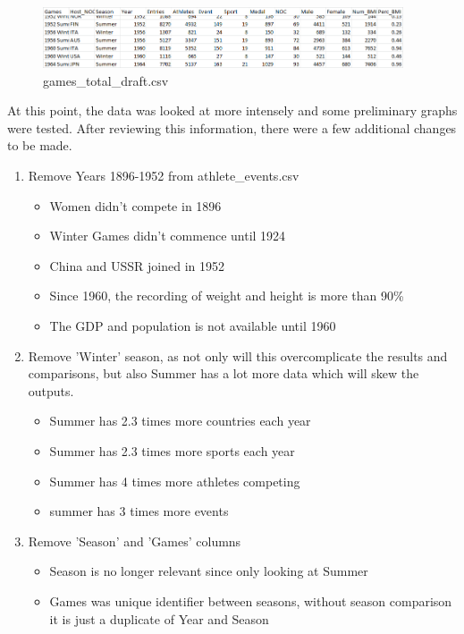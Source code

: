 \documentclass[a4 paper, 12pt]{article}
\begin{document}
        \begin{figure} [H]
            \centering
            \includegraphics[width=0.95\textwidth, frame]
                {./images/data/games_draft.png}     
            \caption{games\_total\_draft.csv}               
        \end{figure} 

    At this point, the data was looked at more intensely and some preliminary graphs were tested. After reviewing this information, there were a few additional changes to be made. 
        \begin{enumerate}
            \item Remove Years 1896-1952 from athlete\_events.csv
                \begin{itemize}
                    \item Women didn't compete in 1896
                    \item Winter Games didn't commence until 1924
                    \item China and USSR joined in 1952
                    \item Since 1960, the recording of weight and height is more than 90\% 
                    \item The GDP and population is not available until 1960
                \end{itemize}
            \item Remove 'Winter' season, as not only will this overcomplicate the results and comparisons, but also Summer has a lot more data which will skew the outputs.
                \begin{itemize}
                    \item Summer has 2.3 times more countries each year
                    \item Summer has 2.3 times more sports each year
                    \item Summer has 4 times more athletes competing
                    \item summer has 3 times more events
                \end{itemize}
            \item Remove 'Season' and 'Games' columns   
                \begin{itemize}
                    \item Season is no longer relevant since only looking at Summer
                    \item Games was unique identifier between seasons, without season comparison it is just a duplicate of Year and Season
                \end{itemize}             
        \end{enumerate}
\end{document}
